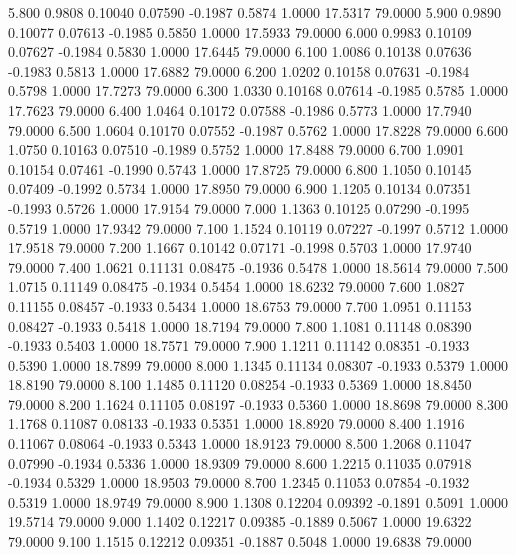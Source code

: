    5.800   0.9808   0.10040   0.07590  -0.1987   0.5874   1.0000  17.5317  79.0000
   5.900   0.9890   0.10077   0.07613  -0.1985   0.5850   1.0000  17.5933  79.0000
   6.000   0.9983   0.10109   0.07627  -0.1984   0.5830   1.0000  17.6445  79.0000
   6.100   1.0086   0.10138   0.07636  -0.1983   0.5813   1.0000  17.6882  79.0000
   6.200   1.0202   0.10158   0.07631  -0.1984   0.5798   1.0000  17.7273  79.0000
   6.300   1.0330   0.10168   0.07614  -0.1985   0.5785   1.0000  17.7623  79.0000
   6.400   1.0464   0.10172   0.07588  -0.1986   0.5773   1.0000  17.7940  79.0000
   6.500   1.0604   0.10170   0.07552  -0.1987   0.5762   1.0000  17.8228  79.0000
   6.600   1.0750   0.10163   0.07510  -0.1989   0.5752   1.0000  17.8488  79.0000
   6.700   1.0901   0.10154   0.07461  -0.1990   0.5743   1.0000  17.8725  79.0000
   6.800   1.1050   0.10145   0.07409  -0.1992   0.5734   1.0000  17.8950  79.0000
   6.900   1.1205   0.10134   0.07351  -0.1993   0.5726   1.0000  17.9154  79.0000
   7.000   1.1363   0.10125   0.07290  -0.1995   0.5719   1.0000  17.9342  79.0000
   7.100   1.1524   0.10119   0.07227  -0.1997   0.5712   1.0000  17.9518  79.0000
   7.200   1.1667   0.10142   0.07171  -0.1998   0.5703   1.0000  17.9740  79.0000
   7.400   1.0621   0.11131   0.08475  -0.1936   0.5478   1.0000  18.5614  79.0000
   7.500   1.0715   0.11149   0.08475  -0.1934   0.5454   1.0000  18.6232  79.0000
   7.600   1.0827   0.11155   0.08457  -0.1933   0.5434   1.0000  18.6753  79.0000
   7.700   1.0951   0.11153   0.08427  -0.1933   0.5418   1.0000  18.7194  79.0000
   7.800   1.1081   0.11148   0.08390  -0.1933   0.5403   1.0000  18.7571  79.0000
   7.900   1.1211   0.11142   0.08351  -0.1933   0.5390   1.0000  18.7899  79.0000
   8.000   1.1345   0.11134   0.08307  -0.1933   0.5379   1.0000  18.8190  79.0000
   8.100   1.1485   0.11120   0.08254  -0.1933   0.5369   1.0000  18.8450  79.0000
   8.200   1.1624   0.11105   0.08197  -0.1933   0.5360   1.0000  18.8698  79.0000
   8.300   1.1768   0.11087   0.08133  -0.1933   0.5351   1.0000  18.8920  79.0000
   8.400   1.1916   0.11067   0.08064  -0.1933   0.5343   1.0000  18.9123  79.0000
   8.500   1.2068   0.11047   0.07990  -0.1934   0.5336   1.0000  18.9309  79.0000
   8.600   1.2215   0.11035   0.07918  -0.1934   0.5329   1.0000  18.9503  79.0000
   8.700   1.2345   0.11053   0.07854  -0.1932   0.5319   1.0000  18.9749  79.0000
   8.900   1.1308   0.12204   0.09392  -0.1891   0.5091   1.0000  19.5714  79.0000
   9.000   1.1402   0.12217   0.09385  -0.1889   0.5067   1.0000  19.6322  79.0000
   9.100   1.1515   0.12212   0.09351  -0.1887   0.5048   1.0000  19.6838  79.0000
